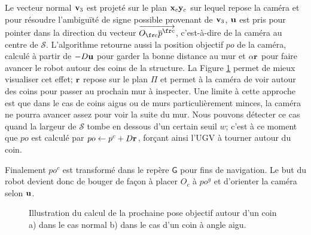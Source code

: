 Le vecteur normal $\mathbf{v}_3$ est projeté sur le plan $\mathbf{x}_c\mathbf{y}_c$ sur lequel repose la caméra et pour résoudre l'ambiguïté de signe possible provenant de $\mathbf{v}_3$, $\mathbf{u}$ est pris pour pointer dans la direction du vecteur $\overrightarrow{O_{\fr c} \overline{p}^{\fr c}}$, c'est-à-dire de la caméra au centre de $\mathcal{S}$. L'algorithme retourne aussi la position objectif ${po}$ de la caméra, calculé à partir de $-D\mathbf{u}$ pour garder la bonne distance au mur et $\alpha \mathbf{r}$ pour faire avancer le robot autour des coins de la structure. La Figure \ref{fig:ugv_goal_determination} permet de mieux visualiser cet effet; $\mathbf{r}$ repose sur le plan $\Pi$ et permet à la caméra de voir autour des coins pour passer au prochain mur à inspecter. Une limite à cette approche est que dans le cas de coins aigus ou de murs particulièrement minces, la caméra ne pourra avancer assez pour voir la suite du mur. Nous pouvons détecter ce cas quand la largeur de $\mathcal{S}$ tombe en dessous d'un certain seuil $w$; c'est à ce moment que ${po}$ est calculé par ${po} \gets p^c + D \mathbf{r}$, forçant ainsi l'UGV à tourner autour du coin.

Finalement ${po^c}$ est transformé dans le repère $\mathsf{G}$ pour fins de navigation. Le but du robot devient donc de bouger de façon à placer $O_c$ à ${po^g}$ et d'orienter la caméra selon $\mathbf{u}$.

\begin{figure}[ht]
  \centering
  \hfil
  \caption{
    Illustration du calcul de la prochaine pose objectif autour d'un coin a) dans le cas normal b) dans le cas d'un coin à angle aigu.
  }
  \label{fig:ugv_goal_determination}
\end{figure}

